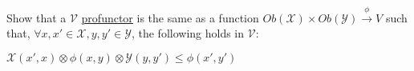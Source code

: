 Show that a $\mathcal{V}$ \href{doc/1 math/Seven Sketches in Compositionality/Chapter 4: Co-design/2 Enriched profunctors/2 V-profunctors/1 V-profunctor}{profunctor} is the same as a function $Ob(\mathcal{X})\times Ob(\mathcal{Y}) \xrightarrow{\phi} V$ such that, $\forall x,x' \in \mathcal{X}, y,y' \in \mathcal{Y}$, the following holds in $\mathcal{V}$:

    $\mathcal{X}(x',x)\otimes \phi(x,y) \otimes \mathcal{Y}(y,y') \leq \phi(x',y')$